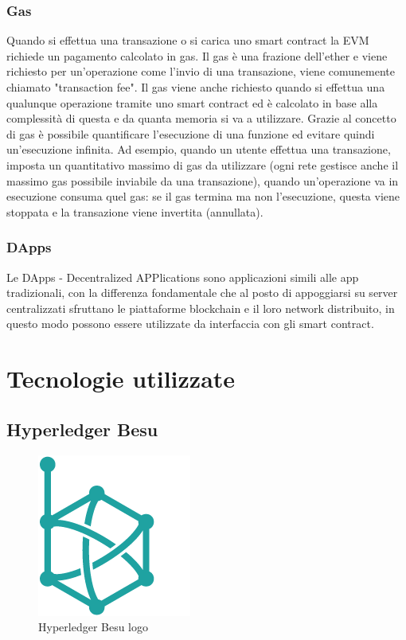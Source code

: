 \documentclass[11pt,a4paper,titlepage, twoside, openright]{report}
\begin{document}
\subsection{Gas}
Quando si effettua una transazione o si carica uno smart contract la EVM richiede un pagamento calcolato in gas. Il gas è una frazione dell'ether e viene richiesto per un'operazione come l'invio di una transazione, viene comunemente chiamato "transaction fee". Il gas viene anche richiesto quando si effettua una qualunque operazione tramite uno smart contract ed è calcolato in base alla complessità di questa e da quanta memoria si va a utilizzare. Grazie al concetto di gas è possibile quantificare l'esecuzione di una funzione ed evitare quindi un'esecuzione infinita. Ad esempio, quando un utente effettua una transazione, imposta un quantitativo massimo di gas da utilizzare (ogni rete gestisce anche il massimo gas possibile inviabile da una transazione), quando un'operazione va in esecuzione consuma quel gas: se il gas termina ma non l'esecuzione, questa viene stoppata e la transazione viene invertita (annullata).

\subsection{DApps}

Le DApps - Decentralized APPlications sono applicazioni simili alle app tradizionali, con la differenza fondamentale che al posto di appoggiarsi su server centralizzati sfruttano le piattaforme blockchain e il loro network distribuito, in questo modo possono essere utilizzate da interfaccia con gli smart contract.

\chapter{Tecnologie utilizzate}

\section{Hyperledger Besu}
\begin{figure}
	\includegraphics[height=0.2\textheight]{Hyperledger_Besu}
	\centering
	\caption{Hyperledger Besu logo}
	\label{fig:Hyperledger_Besu_logo}
\end{figure}
\end{document}
